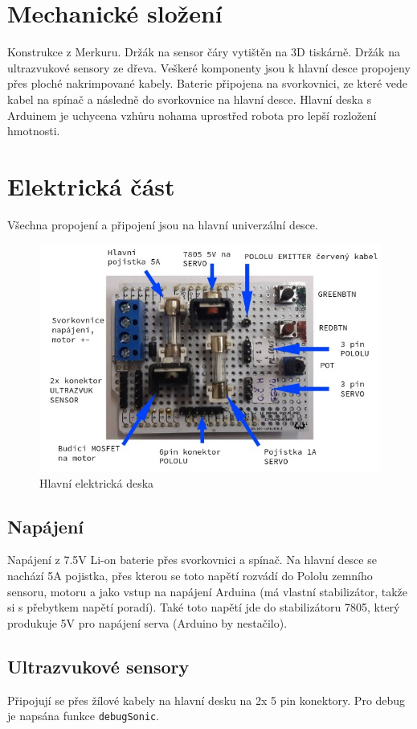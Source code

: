 \documentclass[11pt]{article}
\begin{document}
\section{Mechanické složení}
Konstrukce z Merkuru. Držák na sensor čáry vytištěn na 3D tiskárně. Držák na ultrazvukové sensory ze dřeva. Veškeré komponenty jsou k hlavní desce propojeny přes ploché nakrimpované kabely. Baterie připojena na svorkovnici, ze které vede kabel na spínač a následně do svorkovnice na hlavní desce. Hlavní deska s Arduinem je uchycena vzhůru nohama uprostřed robota pro lepší rozložení hmotnosti.

\section{Elektrická část}
Všechna propojení a připojení jsou na hlavní univerzální desce.
\begin{figure}[h]
	\centering
	\includegraphics[scale=0.75]{deska.jpg}	
	\caption{Hlavní elektrická deska}
	\label{1}
\end{figure}
\subsection{Napájení}
Napájení z 7.5V Li-on baterie přes svorkovnici a spínač. Na hlavní desce se nachází 5A pojistka, přes kterou se toto napětí rozvádí do Pololu zemního sensoru, motoru a jako vstup na napájení Arduina (má vlastní stabilizátor, takže si s přebytkem napětí poradí). Také toto napětí jde do stabilizátoru 7805, který produkuje 5V pro napájení serva (Arduino by nestačilo).
\subsection{Ultrazvukové sensory}
Připojují se přes žílové kabely na hlavní desku na 2x 5 pin konektory. Pro debug je napsána funkce \texttt{debugSonic}.
\end{document}
